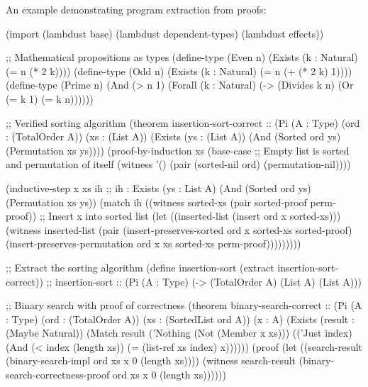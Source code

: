 An example demonstrating program extraction from proofs:

\begin{example}
\begin{lambdustcode}
(import (lambdust base)
        (lambdust dependent-types)
        (lambdust effects))

;; Mathematical propositions as types
(define-type (Even n) (Exists (k : Natural) (= n (* 2 k))))
(define-type (Odd n) (Exists (k : Natural) (= n (+ (* 2 k) 1))))
(define-type (Prime n) (And (> n 1) (Forall (k : Natural) 
                                           (-> (Divides k n) 
                                               (Or (= k 1) (= k n))))))

;; Verified sorting algorithm
(theorem insertion-sort-correct :: (Pi (A : Type) (ord : (TotalOrder A)) 
                                      (xs : (List A))
                                      (Exists (ys : (List A))
                                        (And (Sorted ord ys)
                                             (Permutation xs ys))))
  (proof-by-induction xs
    (base-case
      ;; Empty list is sorted and permutation of itself
      (witness '() (pair (sorted-nil ord) (permutation-nil))))
    
    (inductive-step x xs ih
      ;; ih : Exists (ys : List A) (And (Sorted ord ys) (Permutation xs ys))
      (match ih
        ((witness sorted-xs (pair sorted-proof perm-proof))
         ;; Insert x into sorted list
         (let ((inserted-list (insert ord x sorted-xs)))
           (witness inserted-list
             (pair (insert-preserves-sorted ord x sorted-xs sorted-proof)
                   (insert-preserves-permutation ord x xs sorted-xs perm-proof)))))))))

;; Extract the sorting algorithm
(define insertion-sort (extract insertion-sort-correct))
;; insertion-sort :: (Pi (A : Type) (-> (TotalOrder A) (List A) (List A)))

;; Binary search with proof of correctness
(theorem binary-search-correct :: (Pi (A : Type) (ord : (TotalOrder A))
                                     (xs : (SortedList ord A)) (x : A)
                                     (Exists (result : (Maybe Natural))
                                       (Match result
                                         ('Nothing (Not (Member x xs)))
                                         (('Just index) (And (< index (length xs))
                                                           (= (list-ref xs index) x))))))
  (proof
    (let ((search-result (binary-search-impl ord xs x 0 (length xs))))
      (witness search-result (binary-search-correctness-proof ord xs x 0 (length xs))))))


\end{lambdustcode}
\end{example}
